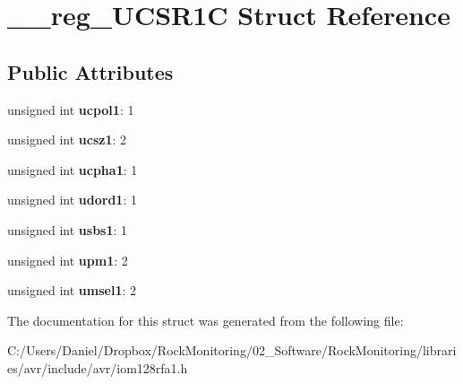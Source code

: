 \hypertarget{struct____reg___u_c_s_r1_c}{}\section{\+\_\+\+\_\+reg\+\_\+\+U\+C\+S\+R1C Struct Reference}
\label{struct____reg___u_c_s_r1_c}
\subsection*{Public Attributes}
\begin{DoxyCompactItemize}
\item 
unsigned int {\bfseries ucpol1}\+: 1\hypertarget{struct____reg___u_c_s_r1_c_a85d340cad15a99e2cbbb52ebbe751508}{}\label{struct____reg___u_c_s_r1_c_a85d340cad15a99e2cbbb52ebbe751508}

\item 
unsigned int {\bfseries ucsz1}\+: 2\hypertarget{struct____reg___u_c_s_r1_c_adca81a9548131cb4eb03adcc90a7c94b}{}\label{struct____reg___u_c_s_r1_c_adca81a9548131cb4eb03adcc90a7c94b}

\item 
unsigned int {\bfseries ucpha1}\+: 1\hypertarget{struct____reg___u_c_s_r1_c_ab1af9d419f8523e169ea67b2d87a43ce}{}\label{struct____reg___u_c_s_r1_c_ab1af9d419f8523e169ea67b2d87a43ce}

\item 
unsigned int {\bfseries udord1}\+: 1\hypertarget{struct____reg___u_c_s_r1_c_a11c36181133ac1c47676c9951dcf7178}{}\label{struct____reg___u_c_s_r1_c_a11c36181133ac1c47676c9951dcf7178}

\item 
unsigned int {\bfseries usbs1}\+: 1\hypertarget{struct____reg___u_c_s_r1_c_a704ab15f293dfa96d4643e311fcf16c9}{}\label{struct____reg___u_c_s_r1_c_a704ab15f293dfa96d4643e311fcf16c9}

\item 
unsigned int {\bfseries upm1}\+: 2\hypertarget{struct____reg___u_c_s_r1_c_a4cd8f5c48e0d0f61f8ac68f38b874047}{}\label{struct____reg___u_c_s_r1_c_a4cd8f5c48e0d0f61f8ac68f38b874047}

\item 
unsigned int {\bfseries umsel1}\+: 2\hypertarget{struct____reg___u_c_s_r1_c_a37fd62f85c2c000c8db68f13ed15d98f}{}\label{struct____reg___u_c_s_r1_c_a37fd62f85c2c000c8db68f13ed15d98f}

\end{DoxyCompactItemize}


The documentation for this struct was generated from the following file\+:\begin{DoxyCompactItemize}
\item 
C\+:/\+Users/\+Daniel/\+Dropbox/\+Rock\+Monitoring/02\+\_\+\+Software/\+Rock\+Monitoring/libraries/avr/include/avr/iom128rfa1.\+h\end{DoxyCompactItemize}
